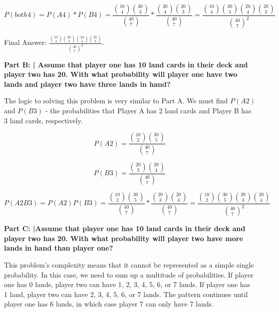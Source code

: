 \documentclass{article}
\begin{document}
 \begin{displaymath}
    P(both 4) = P(A4) * P(B4) = \frac{{10 \choose 4}{30 \choose 3}}{{40 \choose 7}} * \frac{{20 \choose 4}{20 \choose 3}}{{40 \choose 7}} = \frac{{10 \choose 4}{30 \choose 3}{20 \choose 4}{20 \choose 3}}{{40 \choose 7}^2}
 \end{displaymath}
 
 Final Answer: $\frac{{10 \choose 4}{30 \choose 3}{20 \choose 4}{20 \choose 3}}{{40 \choose 7}^2}$.\newline
 
 \textbf{Part B: | Assume that player one has 10 land cards in their deck and player two has 20. With what probability will player one have two lands and player two have three lands in hand?}\newline
 
 The logic to solving this problem is very similar to Part A. We must find $P(A2)$ and $P(B3)$ - the probabilities that Player A has 2 land cards and Player B has 3 land cards, respectively. \newline
 
 \begin{displaymath}
    P(A2) = \frac{{10 \choose 2}{30 \choose 5}}{{40 \choose 7}}
 \end{displaymath}
 
 \begin{displaymath}
    P(B3) = \frac{{20 \choose 3}{20 \choose 4}}{{40 \choose 7}}
 \end{displaymath}
 
 \begin{displaymath}
     P(A2B3) = P(A2)P(B3) = \frac{{10 \choose 2}{30 \choose 5}}{{40 \choose 7}} * \frac{{20 \choose 3}{20 \choose 4}}{{40 \choose 7}} = \frac{{10 \choose 2}{30 \choose 5}{20 \choose 3}{20 \choose 4}}{{40 \choose 7}^2}
 \end{displaymath}
 
 \textbf{Part C: |Assume that player one has 10 land cards in their deck and player two has 20. With what probability will player two have more lands in hand than player one?}\newline
 
 This problem's complexity means that it cannot be represented as a simple single probability. In this case, we need to sum up a multitude of probabilities. If player one has 0 lands, player two can have 1, 2, 3, 4, 5, 6, or 7 lands. If player one has 1 land, player two can have 2, 3, 4, 5, 6, or 7 lands. The pattern continues until player one has 6 lands, in which case player 7 can only have 7 lands. \newline
 
\end{document}
